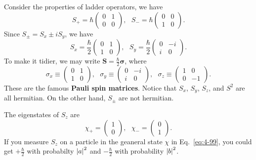 Consider the properties of ladder operators, we have
\begin{equation}
  \label{eq:4-103}
  S_+ = \hbar
  \begin{pmatrix}
    0 & 1 \\
    0 & 0
  \end{pmatrix}
  , ~ ~ ~
  S_- = \hbar
  \begin{pmatrix}
    0 & 0 \\
    1 & 0
  \end{pmatrix}.
\end{equation}
Since $S_{\pm} =S_x \pm i S_y$, we have
\begin{equation}
  \label{eq:4-104}
  S_x = \frac{\hbar}{2}
  \begin{pmatrix}
    0 & 1 \\
    1 & 0
  \end{pmatrix}, ~ ~ ~
  S_y = \frac{\hbar}{2}
  \begin{pmatrix}
    0 & -i \\
    i & 0
  \end{pmatrix}.
\end{equation}
To make it tidier, we may write $\mathbf{S} = \frac{\hbar}{2} \mathbf{\sigma}$, where
\begin{equation}
  \label{eq:4-105}
  \sigma_x \equiv
  \begin{pmatrix}
    0 & 1\\
    1 & 0
  \end{pmatrix}
  , ~ ~ ~
  \sigma_y \equiv
  \begin{pmatrix}
    0 & -i \\
    i & 0
  \end{pmatrix}
  , ~ ~ ~
  \sigma_z \equiv
  \begin{pmatrix}
    1 & 0 \\
    0 & -1
  \end{pmatrix}.
\end{equation}
These are the famous \textbf{Pauli spin matrices}.
Notice that $S_x$, $S_y$, $S_z$, and $S^2$ are all hermitian.
On the other hand, $S_{\pm}$ are not hermitian.

The eigenstates of $S_z$ are
\begin{equation}
  \label{eq:4-106}
  \chi_+=
  \begin{pmatrix}
    1 \\
    0
  \end{pmatrix}
  , ~ ~ ~
  \chi_-=
  \begin{pmatrix}
    0 \\
    1
  \end{pmatrix}.
\end{equation}
If you measure $S_z$ on a particle in the geaneral state $\chi$ in Eq.~\eqref{eq:4-99}, you could get $+ \frac{\hbar}{2}$ with probabilty $\abs{a}^{2}$ and $- \frac{\hbar}{2}$ with probability $\abs{b}^{2}$.

